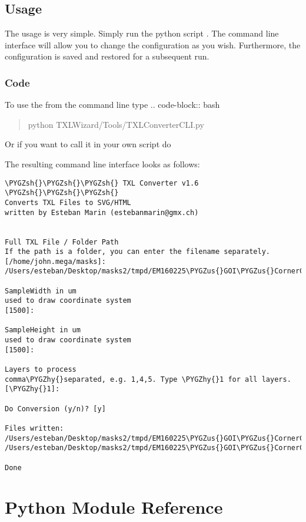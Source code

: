 \documentclass[letterpaper,10pt,english]{sphinxmanual}
\def\PYGZus{\char`\_}
\def\PYGZsh{\char`\#}
\def\PYGZhy{\char`\-}
\begin{document}
\subsection{Usage}
\label{Chapters/30_TXLConverter:usage}
The usage is very simple. Simply run the python script .
The command line interface will allow you to change the configuration as you wish. Furthermore, the configuration is saved
and restored for a subsequent run.


\subsubsection{Code}
\label{Chapters/30_TXLConverter:code}
To use the  from the command line type
.. code-block:: bash
\begin{quote}

python TXLWizard/Tools/TXLConverterCLI.py
\end{quote}

Or if you want to call it in your own script do

The resulting command line interface looks as follows:

\begin{Verbatim}[commandchars=\\\{\}]
\PYGZsh{}\PYGZsh{}\PYGZsh{} TXL Converter v1.6 \PYGZsh{}\PYGZsh{}\PYGZsh{}
Converts TXL Files to SVG/HTML
written by Esteban Marin (estebanmarin@gmx.ch)


Full TXL File / Folder Path
If the path is a folder, you can enter the filename separately.
[/home/john.mega/masks]: /Users/esteban/Desktop/masks2/tmpd/EM160225\PYGZus{}GOI\PYGZus{}CornerCube\PYGZus{}Microbridge.txl

SampleWidth in um
used to draw coordinate system
[1500]:

SampleHeight in um
used to draw coordinate system
[1500]:

Layers to process
comma\PYGZhy{}separated, e.g. 1,4,5. Type \PYGZhy{}1 for all layers.
[\PYGZhy{}1]:

Do Conversion (y/n)? [y]

Files written:
/Users/esteban/Desktop/masks2/tmpd/EM160225\PYGZus{}GOI\PYGZus{}CornerCube\PYGZus{}Microbridge.html
/Users/esteban/Desktop/masks2/tmpd/EM160225\PYGZus{}GOI\PYGZus{}CornerCube\PYGZus{}Microbridge.svg

Done
\end{Verbatim}


\section{Python Module Reference}
\label{Chapters/40_PythonModuleReference:python-module-reference}\label{Chapters/40_PythonModuleReference:pythonmodulereference}\label{Chapters/40_PythonModuleReference::doc}
\end{document}
